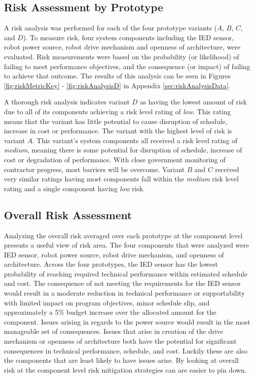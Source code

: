 \documentclass[letterpaper,10pt]{article}
\begin{document}
\subsection{Risk Assessment by Prototype}
A risk analysis was performed for each of the four prototype variants ($A$, $B$, $C$, and $D$). To measure risk, four system components including the IED sensor, robot power source, robot drive mechanism and openness of architecture, were evaluated.  Risk measurements were based on the probability (or likelihood) of failing to meet performance objectives, and the consequence (or impact) of failing to achieve that outcome.  The results of this analysis can be seen in Figures \ref{fig:riskMetricKey} - \ref{fig:riskAnalysisD} in Appendix \ref{sec:riskAnalysisData}.

A thorough risk analysis indicates variant $D$ as having the lowest amount of risk due to all of its components achieving a risk level rating of \emph{low}. This rating means that the variant has little potential to cause disruption of schedule, increase in cost or performance. The variant with the highest level of risk is variant $A$. This variant's system components all received a risk level rating of \emph{medium}, meaning there is some potential for disruption of schedule, increase of cost or degradation of performance. With close government monitoring of contractor progress, most barriers will be overcome. Variant $B$ and $C$ received very similar ratings having most components fall within the \emph{medium} risk level rating and a single component having \emph{low} risk. 

\subsection{Overall Risk Assessment}
Analyzing the overall risk averaged over each prototype at the component level presents a useful view of risk area. The four components that were analyzed were IED sensor, robot power source, robot drive mechanism, and openness of architecture. Across the four prototypes, the IED sensor has the lowest probability of reaching required technical performance within estimated schedule and cost. The consequence of not meeting the requirements for the IED sensor would result in a moderate reduction in technical performance or supportability with limited impact on program objectives, minor schedule slip, and approximately a 5\% budget increase over the allocated amount for the component. Issues arising in regards to the power source would result in the most manageable set of consequences. Issues that arise in creation of the drive mechanism or openness of architecture both have the potential for significant consequences in technical performance, schedule, and cost. Luckily these are also the components that are least likely to have issues arise. By looking at overall risk at the component level risk mitigation strategies can are easier to pin down.
\end{document}
